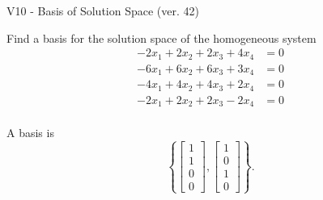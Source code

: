 \begin{exercise}
  \begin{exerciseTitle}V10 - Basis of Solution Space (ver. 42)\end{exerciseTitle}
  \begin{exerciseStatement}
    Find a basis for the solution space of the homogeneous system 
\begin{align*}
 -2 x_ 1 + 2 x_ 2 + 2 x_ 3 + 4 x_ 4 &= 0  \\ 
  -6 x_ 1 + 6 x_ 2 + 6 x_ 3 + 3 x_ 4 &= 0  \\ 
  -4 x_ 1 + 4 x_ 2 + 4 x_ 3 + 2 x_ 4 &= 0  \\ 
  -2 x_ 1 + 2 x_ 2 + 2 x_ 3 -2 x_ 4 &= 0  \\ 
 \end{align*}


 
  \end{exerciseStatement}

  \begin{exerciseAnswer}
   A basis is   
\[\left\{\left[\begin{array}{c}
1 \\
1 \\
0 \\
0
\end{array}\right] , \left[\begin{array}{c}
1 \\
0 \\
1 \\
0
\end{array}\right]\right\}.\]

  


  \end{exerciseAnswer}
\end{exercise}